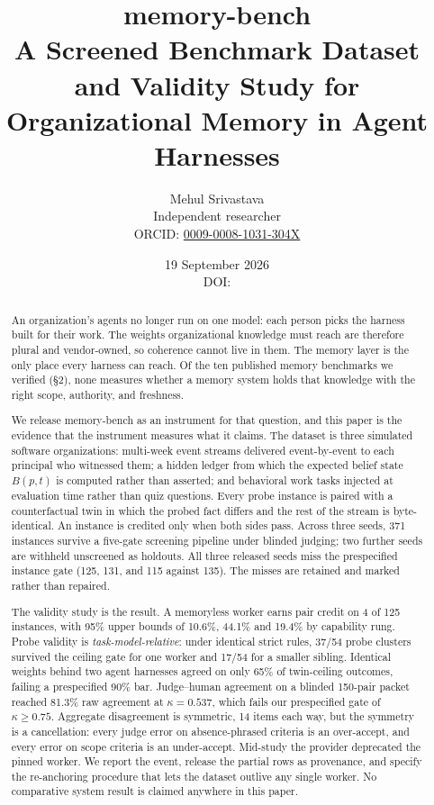 \documentclass[11pt]{article}
\title{\textbf{memory-bench}\\[.3em]
\large A Screened Benchmark Dataset and Validity Study for\\
Organizational Memory in Agent Harnesses}
\author{Mehul Srivastava\\\normalsize Independent researcher\\
\normalsize ORCID: \href{https://orcid.org/0009-0008-1031-304X}{0009-0008-1031-304X}}
\date{19 September 2026\\[.45em]
\normalsize DOI: \href{https://doi.org/\zenodoDOI}{\zenodoDOI}}
\begin{document}
\maketitle

\begin{abstract}
\noindent
An organization's agents no longer run on one model: each person picks the
harness built for their work. The weights organizational knowledge must reach are
therefore plural and vendor-owned, so coherence cannot live in them. The memory
layer is the only place every harness can reach. Of the ten published memory
benchmarks we verified (\S2), none measures whether a memory system holds that
knowledge with the right scope, authority, and freshness.

We release memory-bench as an instrument for that question, and this paper is the
evidence that the instrument measures what it claims. The dataset is three
simulated software organizations: multi-week event streams delivered
event-by-event to each principal who witnessed them; a hidden ledger from which
the expected belief state $B(p,t)$ is computed rather than asserted; and
behavioral work tasks injected at evaluation time rather than quiz questions.
Every probe instance is paired with a counterfactual twin in which the probed
fact differs and the rest of the stream is byte-identical. An instance is
credited only when both sides pass. Across three seeds, 371 instances survive a
five-gate screening pipeline under blinded judging; two further seeds are
withheld unscreened as holdouts. All three released seeds miss the prespecified
instance gate (125, 131, and 115 against 135). The misses are retained and marked
rather than repaired.

The validity study is the result. A memoryless worker earns pair credit on 4 of
125 instances, with 95\% upper bounds of 10.6\%, 44.1\% and 19.4\% by capability
rung. Probe validity is \emph{task-model-relative}: under identical strict rules,
37/54 probe clusters survived the ceiling gate for one worker and 17/54 for a
smaller sibling. Identical weights behind two agent harnesses agreed on only 65\% of
twin-ceiling outcomes, failing a prespecified 90\% bar. Judge--human agreement on
a blinded 150-pair packet reached 81.3\% raw agreement at $\kappa = 0.537$, which
fails our prespecified gate of $\kappa \geq 0.75$. Aggregate disagreement is
symmetric, 14 items each way, but the symmetry is a cancellation: every judge
error on absence-phrased criteria is an over-accept, and every error on scope
criteria is an under-accept. Mid-study the provider deprecated the pinned worker.
We report the event, release the partial rows as provenance, and specify the
re-anchoring procedure that lets the dataset outlive any single worker. No
comparative system result is claimed anywhere in this paper.
\end{abstract}
\end{document}
